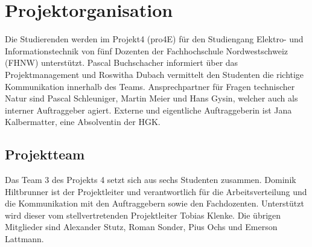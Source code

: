 \documentclass[10pt,a4paper,oneside]{99_fhnwreport}
\begin{document}
\section{Projektorganisation}\label{sec:projektorganisation}

Die Studierenden werden im Projekt4 (pro4E) für den Studiengang Elektro- und Informationstechnik von fünf Dozenten der Fachhochschule Nordwestschweiz (FHNW) unterstützt. Pascal Buchschacher informiert über das Projektmanagement und Roswitha Dubach vermittelt den Studenten die richtige Kommunikation innerhalb des Teams. Ansprechpartner für Fragen technischer Natur sind Pascal Schleuniger, Martin Meier und Hans Gysin, welcher auch als interner Auftraggeber agiert.
Externe und eigentliche Auftraggeberin ist Jana Kalbermatter, eine Absolventin der HGK.

\subsection{Projektteam}\label{subsec:projektteam}
Das Team 3 des Projekts 4 setzt sich aus sechs Studenten zusammen. Dominik Hiltbrunner ist der Projektleiter und verantwortlich für die Arbeitsverteilung und die Kommunikation mit den Auftraggebern sowie den Fachdozenten. Unterstützt wird dieser vom stellvertretenden Projektleiter Tobias Klenke. Die übrigen Mitglieder sind Alexander Stutz, Roman Sonder, Pius Ochs und Emerson Lattmann. 
\newpage
\end{document}
